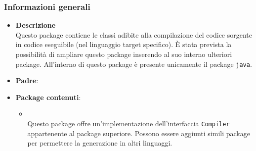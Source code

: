 \subsubsection{Informazioni generali}
\begin{itemize}
\item \textbf{Descrizione}\\
Questo package contiene le classi adibite alla compilazione del codice sorgente in codice eseguibile (nel linguaggio target specifico). È stata prevista la possibilità di ampliare questo package inserendo al suo interno ulteriori package. All'interno di questo package è presente unicamente il package \texttt{java}.
\item \textbf{Padre}: \hyperref[\nogloxy{swedesigner::server}]{}
\item \textbf{Package contenuti}:
\begin{itemize}
\item \hyperref[\nogloxy{swedesigner::server::compiler::java}]{}\\
Questo package offre un'implementazione dell'interfaccia \texttt{Compiler} appartenente al package superiore. Possono essere aggiunti simili package per permettere la generazione in altri linguaggi.
\end{itemize}
\end{itemize}
